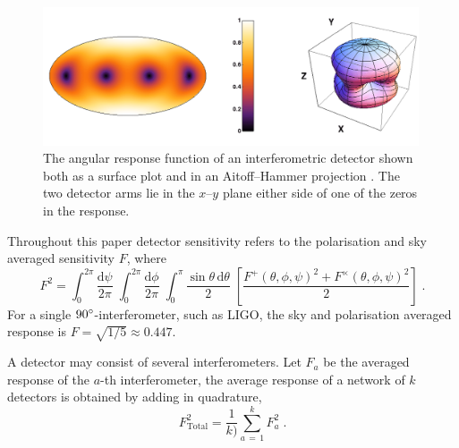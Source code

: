 \begin{figure}
 \centering
 \includegraphics[trim=0cm 0cm 0cm 0cm, width=0.99\textwidth]{LIGO_detectorframe.pdf}
 \caption{The angular response function of an interferometric detector shown both as a surface plot and in an Aitoff--Hammer projection . The two detector arms lie in the $x$--$y$ plane either side of one of the zeros in the response. }
 \label{fig:LIGO}
\end{figure}

Throughout this paper detector sensitivity refers to the polarisation and sky averaged sensitivity $F$, where
\begin{equation}\label{eq:skyav}
F^{2}=\int_{0}^{2\pi}\frac{\mathrm{d}\psi}{2\pi}\; \int_{0}^{2\pi} \frac{\mathrm{d}\phi}{2\pi}\; \int_{0}^{\pi}\frac{\sin\theta\,\mathrm{d}\theta}{2}\;\left[\frac{F^{+}\left(\theta,\phi,\psi\right)^{2}+F^{\times}\left(\theta,\phi,\psi\right)^{2}}{2}\right]\; .
\end{equation}
For a single $90^\circ$-interferometer, such as LIGO, the sky and polarisation averaged response is $F=\sqrt{1/5}\approx 0.447$.

A detector may consist of several interferometers. Let $F_{a}$ be the averaged response of the $a$-th interferometer, the average response of a network of $k$ detectors is obtained by adding in quadrature,
\begin{equation} F_{\mathrm{Total}}^{2}=\frac{1}{k)}\sum_{a\,=\,1}^{k}F_{a}^{2} \; .\end{equation}

